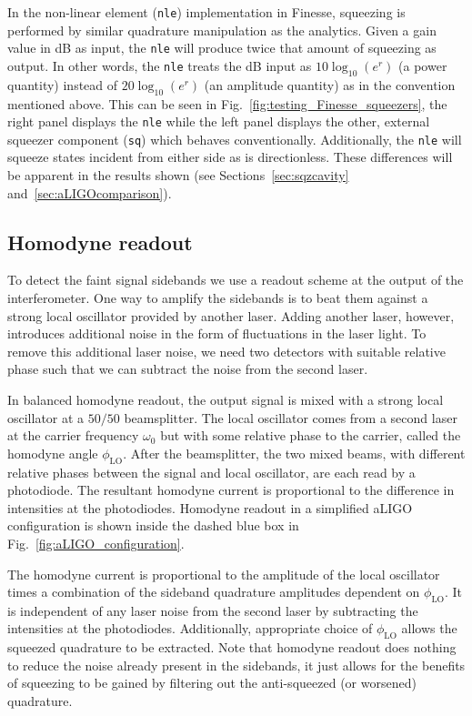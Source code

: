 \documentclass[aps,pra,superscriptaddress,reprint,nofootinbib]{revtex4-1}
\newcommand{\code}[1]{\texttt{#1}}
\begin{document}
In the non-linear element (\code{nle}) implementation in Finesse, squeezing is performed by similar quadrature manipulation as the analytics. Given a gain value in dB as input, the \code{nle} will produce twice that amount of squeezing as output. In other words, the \code{nle} treats the dB input as $10 \log_{10} (e^r)$ (a power quantity) instead of $20 \log_{10} (e^r)$ (an amplitude quantity) as in the convention mentioned above. This can be seen in Fig.~\ref{fig:testing_Finesse_squeezers}, the right panel displays the \code{nle} while the left panel displays the other, external squeezer component (\code{sq}) which behaves conventionally. Additionally, the \code{nle} will squeeze states incident from either side as is directionless. These differences will be apparent in the results shown (see Sections~\ref{sec:sqzcavity} and~\ref{sec:aLIGOcomparison}).


\subsection{Homodyne readout}
\label{sec:homodyne}

To detect the faint signal sidebands we use a readout scheme at the output of the interferometer.
One way to amplify the sidebands is to beat them against a strong local oscillator provided by another laser. Adding another laser, however, introduces additional noise in the form of fluctuations in the laser light. To remove this additional laser noise, we need two detectors with suitable relative phase such that we can subtract the noise from the second laser.


In balanced homodyne readout, the output signal is mixed with a strong local oscillator at a $50/50$ beamsplitter. The local oscillator comes from a second laser at the carrier frequency $\omega_0$ but with some relative phase to the carrier, called the homodyne angle $\phi_{\mathrm{LO}}$. After the beamsplitter, the two mixed beams, with different relative phases between the signal and local oscillator, are each read by a photodiode.
The resultant homodyne current is proportional to the difference in intensities at the photodiodes.
Homodyne readout in a simplified aLIGO configuration is shown inside the dashed blue box in Fig.~\ref{fig:aLIGO_configuration}.


The homodyne current is proportional to the amplitude of the local oscillator times a combination of the sideband quadrature amplitudes dependent on $\phi_{\mathrm{LO}}$. It is independent of any laser noise from the second laser by subtracting the intensities at the photodiodes. Additionally, appropriate choice of $\phi_{\mathrm{LO}}$ allows the squeezed quadrature to be extracted. Note that homodyne readout does nothing to reduce the noise already present in the sidebands, it just allows for the benefits of squeezing to be gained by filtering out the anti-squeezed (or worsened) quadrature.
\end{document}
